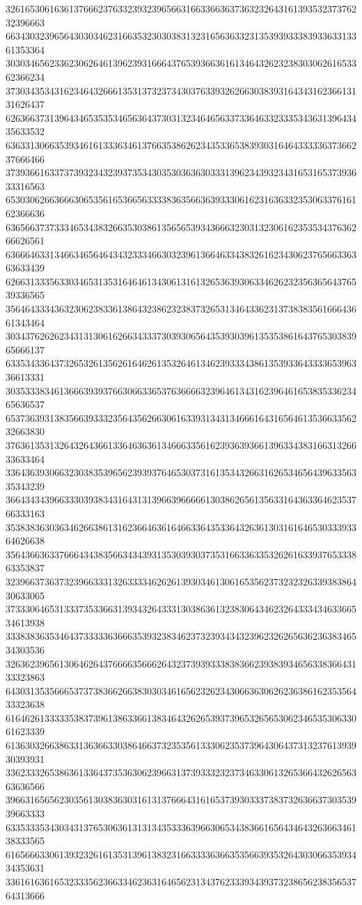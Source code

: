32616530616361376662376332393239656631663366363736323264316139353237376232396663
66343032396564303034623166353230303831323165636332313539393338393363313361353364
30303465623362306264613962393166643765393663616134643262323830306261653362366234
37303435343162346432666135313732373430376339326266303839316434316236613131626437
62636637313964346535353465636437303132346465633733646332333534363139643435633532
63633130663539346161333634613766353862623435336538393031646433333637366237666466
37393661633737393234323937353430353036363033313962343932343165316537393633316563
65303062663666306535616536656333383635663639333061623163633235306337616162366636
63656637373334653438326635303861356565393436663230313230616235353437636266626561
63666463313466346564643432333466303239613664633438326162343062376566336363633439
62663133356330346531353164646134306131613265363930633462623235636564376539336565
35646433343632306238336138643238623238373265313464336231373838356166643661343464
30343762626234313130616266343337303930656435393039613535386164376530383965666137
63353433643732653261356261646261353264613462393334386135393364333365396336613331
30353338346136663939376630663365376366663239646134316239646165383533623465636537
65373639313835663933323564356266306163393134313466616431656461353663356232663830
37636135313264326436613364636361346663356162393639366139633438316631326633633464
33643639306632303835396562393937646530373161353432663162653465643963356335343239
36643434396633303938343164313139663966666130386265613563316436336462353766333163
35383836303634626638613162366463616466336435336432636130316164653033393364626638
35643663633766643438356634343931353039303735316633633532626163393765333863353837
32396637363732396633313263333462626139303461306165356237323232633938386430633065
37333064653133373533663139343264333130386361323830643462326433343463366534613938
33383836353464373333363666353932383462373239343432396232626563623638346534303536
32636239656130646264376666356662643237393933383836623938393465633836643133323863
64303135356665373738366266383030346165623262343066363062623638616235356433323638
61646261333335383739613863366138346432626539373965326565306234653530633061623339
61363032663863313636633038646637323535613330623537396430643731323761393930393931
33623332653863613364373536306239663137393332323734633061326536643262656363636566
39663165656230356130383630316131376664316165373930333738373263663730353939663333
63353335343034313765306361313134353336396630653438366165643464326366346138333565
61656663306139323261613531396138323166333363663535663935326430306635393434353631
33616163616532333562366334623631646562313437623339343937323865623835653764313666
